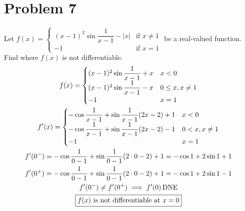 \documentclass[12pt]{article}
\newcommand{\problem}[1]{\section{Problem #1}}
\DeclareMathOperator{\dne}{DNE}
\begin{document}
\problem{7}
Let $f(x)=\begin{cases}
    (x-1)^2\sin \dfrac{1}{x-1}-|x| &\text{if }x\ne1\\
    -1 &\text{if }x=1
\end{cases}$ be a real-valued function. Find where $f(x)$ is not differentiable.
\begin{gather*}
    f(x)=\begin{cases}
    (x-1)^2\sin \dfrac{1}{x-1}+x &x <0\\
    (x-1)^2\sin \dfrac{1}{x-1}-x &0 \le x, x\ne 1\\
    -1 &x=1
    \end{cases}\\
    f'(x)=\begin{cases}
    -\cos \dfrac{1}{x-1}+\sin \dfrac{1}{x-1}(2x-2)+1 &x <0\\
    -\cos \dfrac{1}{x-1}+\sin \dfrac{1}{x-1}(2x-2)-1 &0 < x, x\ne 1\\
    -1 &x=1
    \end{cases}\\
    f'(0^-)=-\cos \frac{1}{0-1}+\sin \frac{1}{0-1}(2\cdot0-2)+1=-\cos 1 +2 \sin 1+1\\
    f'(0^+)=-\cos \frac{1}{0-1}+\sin \frac{1}{0-1}(2\cdot0-2)+1=-\cos 1 +2 \sin 1-1\\
    f'(0^-) \ne f'(0^+) \implies f'(0) \dne \\
    \boxed{f(x) $ is not differentiable at $ x=0}
\end{gather*}
\end{document}

